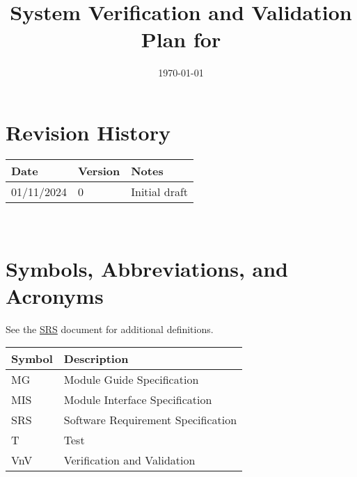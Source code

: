 \documentclass[12pt, titlepage]{article}
\begin{document}
\title{System Verification and Validation Plan for \progname{}} 
\author{\authname}
\date{\today}
	
\maketitle


\section*{Revision History}

\begin{tabularx}{\textwidth}{p{3cm}p{2cm}X}
\toprule {\bf Date} & {\bf Version} & {\bf Notes}\\
\midrule
01/11/2024 & 0 & Initial draft\\
\bottomrule
\end{tabularx}

~\\

\newpage

\tableofcontents

\listoftables

\listoffigures
{}

\newpage

\section{Symbols, Abbreviations, and Acronyms}
See the \href{https://github.com/emilyperica/ScoreGen/blob/main/docs/SRS-Volere/SRS.pdf}{SRS} document for additional definitions. \\

\renewcommand{\arraystretch}{1.2}
\begin{tabular}{l l} 
  \toprule		
  \textbf{Symbol} & \textbf{Description}\\
  \midrule 
  MG & Module Guide Specification\\
  MIS & Module Interface Specification\\ 
  SRS & Software Requirement Specification\\
  T & Test\\
  VnV & Verification and Validation\\
  \bottomrule
\end{tabular}\\

\newpage
\end{document}
